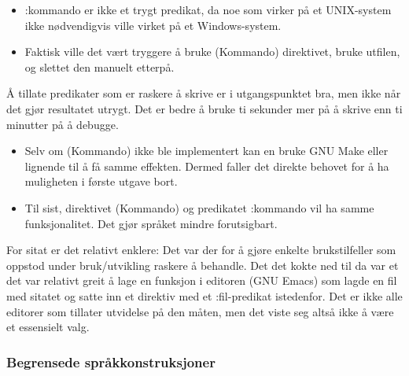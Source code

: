 \documentclass[norsk, 11pt, a4paper]{article}
\begin{document}
\begin{itemize}
\item :kommando er ikke et trygt predikat, da noe som virker på et UNIX-system ikke nødvendigvis ville virket på et Windows-system.
\end{itemize}





\begin{itemize}
\item Faktisk ville det vært tryggere å bruke (Kommando) direktivet, bruke utfilen, og slettet den manuelt etterpå.
\end{itemize}

   Å tillate predikater som er raskere å skrive er i utgangspunktet bra, men ikke når det gjør resultatet utrygt. Det er bedre å bruke ti sekunder mer på å skrive enn ti minutter på å debugge.




\begin{itemize}
\item Selv om (Kommando) ikke ble implementert kan en bruke GNU Make eller lignende til å få samme effekten. Dermed faller det direkte behovet for å ha muligheten i første utgave bort.
\end{itemize}





\begin{itemize}
\item Til sist, direktivet (Kommando) og predikatet :kommando vil ha samme funksjonalitet. Det gjør språket mindre forutsigbart.
\end{itemize}




For sitat er det relativt enklere: Det var der for å gjøre enkelte brukstilfeller som oppstod under bruk/utvikling raskere å behandle. Det det kokte ned til da var et det var relativt greit å lage en funksjon i editoren (GNU Emacs) som lagde en fil med sitatet og satte inn et direktiv med et :fil-predikat istedenfor.
Det er ikke alle editorer som tillater utvidelse på den måten, men det viste seg altså ikke å være et essensielt valg.



\subsubsection{Begrensede språkkonstruksjoner}
\end{document}
